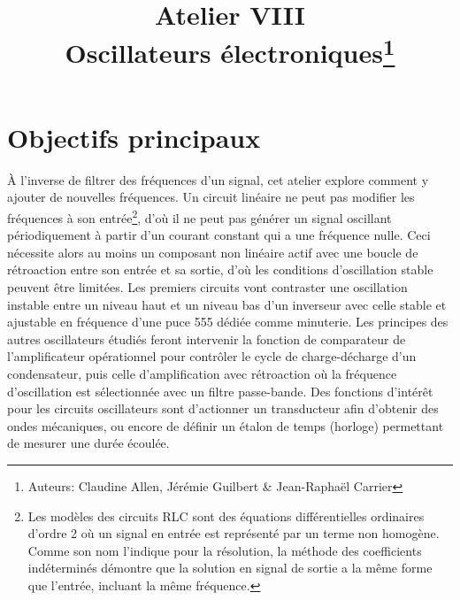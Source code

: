\documentclass[canadien,12pt,oneside,letterpaper]{article}
\title{\textbf{Atelier VIII}\\Oscillateurs électroniques\thanks{Auteurs: Claudine Allen, Jérémie Guilbert \& Jean-Raphaël Carrier}}
\date{}
\begin{document}
\maketitle \vspace{-2.5cm}

\section{Objectifs principaux}\label{sec:objectifs}
À l’inverse de filtrer des fréquences d’un signal, cet atelier explore comment y ajouter de nouvelles fréquences. Un circuit linéaire ne peut pas modifier les fréquences à son entrée\footnote{Les modèles des circuits RLC sont des équations différentielles ordinaires d'ordre 2 où un signal en entrée est représenté par un terme non homogène. Comme son nom l'indique pour la résolution, la méthode des coefficients indéterminés démontre que la solution en signal de sortie a la même forme que l'entrée, incluant la même fréquence.}, d'où il ne peut pas générer un signal oscillant périodiquement à partir d’un courant constant qui a une fréquence nulle. Ceci nécessite alors au moins un composant non linéaire actif avec une boucle de rétroaction entre son entrée et sa sortie, d'où les conditions d'oscillation stable peuvent être limitées. Les premiers circuits vont contraster une oscillation instable entre un niveau haut et un niveau bas d'un inverseur avec celle stable et ajustable en fréquence d'une puce 555 dédiée comme minuterie. Les principes des autres oscillateurs étudiés feront intervenir la fonction de comparateur de l’amplificateur opérationnel pour contrôler le cycle de charge-décharge d’un condensateur, puis celle d’amplification avec rétroaction où la fréquence d’oscillation est sélectionnée avec un filtre passe-bande. Des fonctions d’intérêt pour les circuits oscillateurs sont d’actionner un transducteur afin d’obtenir des ondes mécaniques, ou encore de définir un étalon de temps (horloge) permettant de mesurer une durée écoulée. %

\end{document}
